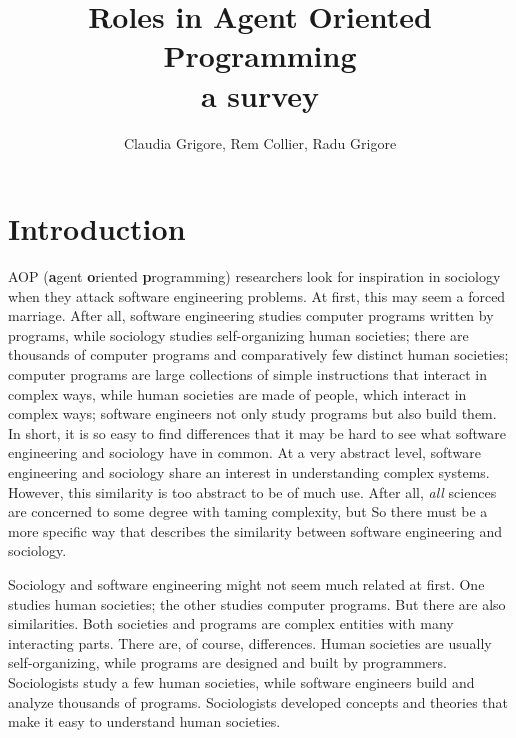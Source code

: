 \documentclass{article}
\title{Roles in Agent Oriented Programming\\\normalsize{a survey}}
\author{Claudia Grigore, Rem Collier, Radu Grigore}
\def\fb#1{\textbf{#1}}
\begin{document}
\maketitle

\begin{abstract}
\end{abstract}
\section{Introduction}


AOP (\fb agent \fb oriented \fb programming) researchers look for inspiration in sociology when they attack software engineering problems.
At first, this may seem a forced marriage.
After all, software engineering studies computer programs written by programs, while sociology studies self-organizing human societies; there are thousands of computer programs and comparatively few distinct human societies; computer programs are large collections of simple instructions that interact in complex ways, while human societies are made of people, which interact in complex ways; software engineers not only study programs but also build them.
In short, it is so easy to find differences that it may be hard to see what software engineering and sociology have in common.
At a very abstract level, software engineering and sociology share an interest in understanding complex systems.
However, this similarity is too abstract to be of much use.
After all, \emph{all} sciences are concerned to some degree with taming complexity, but 
So there must be a more specific way that describes the similarity between software engineering and sociology.


Sociology and software engineering might not seem much related at first.
One studies human societies; the other studies computer programs.
But there are also similarities.
Both societies and programs are complex entities with many interacting parts.
There are, of course, differences.
Human societies are usually self-organizing, while programs are designed and built by programmers.
Sociologists study a few human societies, while software engineers build and analyze thousands of programs.
Sociologists developed concepts and theories that make it easy to understand human societies.
\end{document}
